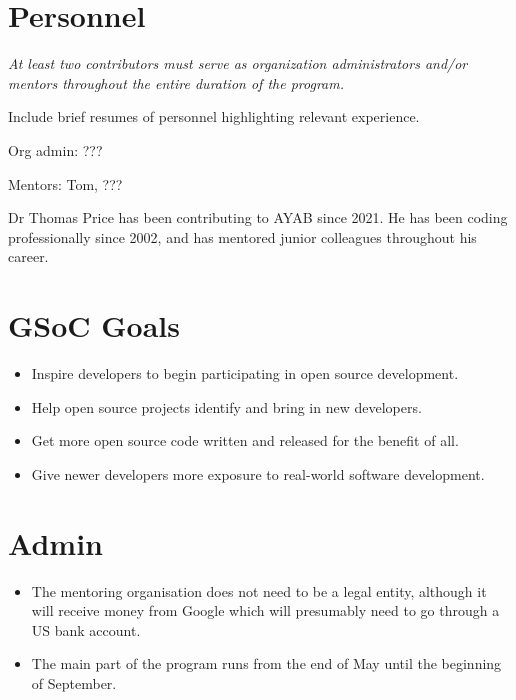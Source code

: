 \documentclass{article}
\begin{document}
\section{Personnel}

{\itshape 
At least two contributors must serve as organization administrators and/or mentors throughout the entire duration of the program.

Include brief resumes of personnel highlighting relevant experience.
}
\newline

\begin{flushleft}
Org admin: ???
\newline

Mentors: Tom, ???
\end{flushleft}

Dr Thomas Price has been contributing to AYAB since 2021. He has been coding professionally since 2002, and has mentored junior colleagues throughout his career.


\section{GSoC Goals}

{\itshape
\begin{itemize}
\item Inspire developers to begin participating in open source development.
\item Help open source projects identify and bring in new developers.
\item Get more open source code written and released for the benefit of all.
\item Give newer developers more exposure to real-world software development.
\end{itemize}
}


\section{Admin}

{\itshape 
\begin{itemize}
\item The mentoring organisation does not need to be a legal entity, although it will receive money from Google which will presumably need to go through a US bank account.
\item The main part of the program runs from the end of May until the beginning of September.
\end{itemize}
}
\end{document}

